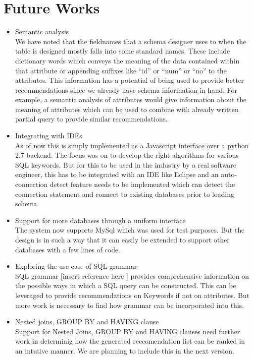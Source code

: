 \documentclass{acm_proc_article-sp}
\begin{document}
\section{Future Works}
\begin{itemize}
\item Semantic analysis \\
We have noted that the fieldnames that a schema designer uses to when the table is designed mostly falls into some standard names. These include dictionary words which conveys the meaning of the data contained within that attribute or appending suffixes like ``id'' or ``num'' or ``no'' to the attributes. This information has a potential of being used to provide better recommendations since we already have schema information in hand. For example, a semantic analysis of attributes would give information about the meaning of attributes which can be used to combine with already written partial query to provide similar recommendations.  

\item Integrating with IDEs\\
As of now this is simply implemented as a Javascript interface over a python 2.7 backend. The focus was on to develop the right algorithms for various SQL keywords. But for this to be used in the industry by a real software engineer, this has to be integrated with an IDE like Eclipse and an auto-connection detect feature needs to be implemented which can detect the connection statement and connect to existing databases prior to loading schema. 

\item Support for more databases through a uniform interface \\
The system now supports MySql which was used for test purposes. But the design is in such a way that it can easily be extended to support other databases with a few lines of code. 

\item Exploring the use case of SQL grammar\\
SQL grammar [insert reference here ] provides comprehensive information on the possible ways in which a SQL query can be constructed. This can be leveraged to provide recommendations on Keywords if not on attributes.  But more work is necessary to find how grammar can be incorporated into this. 

\item Nested joins, GROUP BY and HAVING clause\\
Support for Nested Joins, GROUP BY and HAVING clauses need further work in determinig how the generated reccomendation list can be ranked in an intutive manner. We are planning to include this in the next version. 

\end{itemize}
\end{document}
